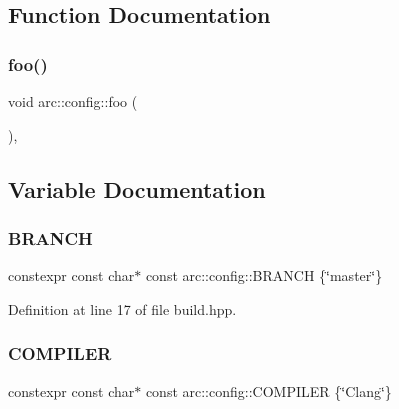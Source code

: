 \subsection{Function Documentation}
\mbox{\label{namespacearc_1_1config_abdd5627a0a104f77f03efd18d2342ac9}} 
\subsubsection{\texorpdfstring{foo()}{foo()}}
{\footnotesize\ttfamily void arc\+::config\+::foo (\begin{DoxyParamCaption}{ }\end{DoxyParamCaption})\hspace{0.3cm}{\ttfamily [inline]}, {\ttfamily [noexcept]}}



\subsection{Variable Documentation}
\mbox{\label{namespacearc_1_1config_a8e30a8a92602b7af3d1aa1281277d630}} 
\subsubsection{\texorpdfstring{BRANCH}{BRANCH}}
{\footnotesize\ttfamily constexpr const char$\ast$ const arc\+::config\+::\+B\+R\+A\+N\+CH \{\char`\"{}master\char`\"{}\}}



Definition at line 17 of file build.\+hpp.

\mbox{\label{namespacearc_1_1config_a1a2ea0c0efab402ce44cf50e556eb48d}} 
\subsubsection{\texorpdfstring{COMPILER}{COMPILER}}
{\footnotesize\ttfamily constexpr const char$\ast$ const arc\+::config\+::\+C\+O\+M\+P\+I\+L\+ER \{\char`\"{}Clang\char`\"{}\}}



